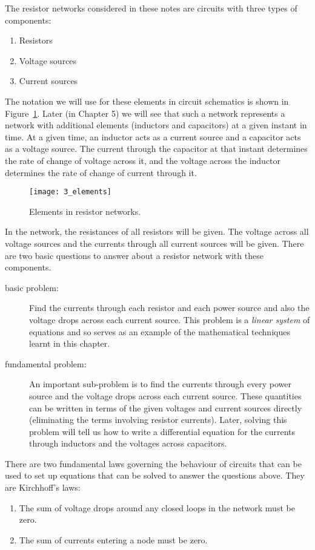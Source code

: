 The resistor networks considered in these notes are circuits with three 
types of components:
\begin{enumerate}
\item Resistors 
\item Voltage sources 
\item Current sources 
\end{enumerate}
The notation we will use for these elements in circuit schematics 
is shown in Figure~\ref{fig_elements}. Later (in Chapter 5) 
we will see that such a 
network represents a network with additional elements (inductors 
and capacitors) at a given instant in time. At a given time, an inductor 
acts as a current source and a capacitor acts as a voltage source. 
The current through the capacitor at that instant determines the rate 
of change of voltage across it, and the voltage across the inductor 
determines the rate of change of current through it. 

\begin{figure}
\centerline{\texttt{[image: 3\_elements]}}
\caption{Elements in resistor networks. 
\label{fig_elements}}
\end{figure}

In the network, the resistances of all resistors will be given. The 
voltage across all voltage sources and the currents through all current 
sources will be given. 
There are two basic questions to answer about a resistor network with these
components. 
\begin{description}
\item[basic problem:] Find the currents through each resistor 
and each power source and also the voltage drops across each 
current source. This problem is a {\em linear system} of equations and 
so serves as an example of the mathematical techniques learnt in this 
chapter. 
\item[fundamental problem:] An important sub-problem is to find the 
currents through every power source and the voltage drops across 
each current source. These quantities can be written in terms of the given 
voltages and current sources directly (eliminating the terms involving 
resistor currents). 
Later, solving this problem will tell us how to 
write a differential equation for the currents through inductors and 
the voltages across capacitors. 
\end{description}

There are two fundamental laws governing the behaviour of circuits that 
can be used to set up equations that can be solved to answer the questions 
above. They are Kirchhoff's laws:
\begin{enumerate}
\item The sum of voltage drops around any closed loops in the network 
must be zero. 
\item The sum of currents entering a node must be zero. 
\end{enumerate}

